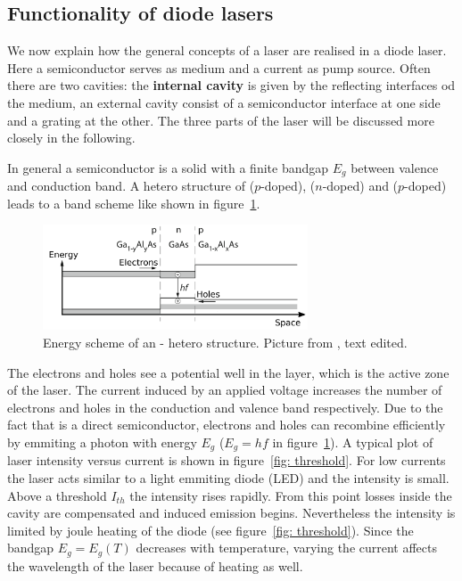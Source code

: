 \subsection{Functionality of diode lasers}
We now explain how the general concepts of a laser are realised in a diode laser. Here a semiconductor serves as medium and a current as pump source.
Often there are two cavities: the \textbf{internal cavity} is given by the reflecting interfaces od the medium, an external cavity consist of
a semiconductor interface at one side and a grating at the other. The three parts of the laser will be discussed more closely in the following.

In general a semiconductor is a solid with a finite bandgap $E_g$ between valence and conduction band. A hetero structure of  ($p$-doped),
 ($n$-doped)
and  ($p$-doped) leads to a band scheme like shown in figure~\ref{fig: bandstructure}. 
\begin{figure}
  \centering
  \includegraphics[width = 0.7\textwidth]{pics/hetero_structure.pdf}
  \caption{Energy scheme of an - hetero structure. Picture from \cite{eichler}, text edited.}
  \label{fig: bandstructure}
\end{figure}
The electrons and holes see a potential well
in the  layer, which is the active zone of the laser. The current induced by an applied voltage increases the number of electrons
and holes in the conduction and valence band respectively. Due to the fact that  is a direct semiconductor, electrons and holes can
recombine efficiently by emmiting a photon with energy $E_g$ ($E_g = hf$ in figure~\ref{fig: bandstructure}). A typical plot of laser intensity versus current is shown in figure~\ref{fig: threshold}. For low
currents the laser acts similar to a light emmiting diode (LED) and the intensity is small. Above a threshold $I_{th}$ the intensity rises rapidly.
From this point losses inside the cavity are compensated and induced emission begins. Nevertheless the intensity is limited by joule heating
of the diode (see figure~\ref{fig: threshold}). Since the bandgap $E_g = E_g(T)$ decreases with temperature, varying the current affects
the wavelength of the laser because of heating as well.



